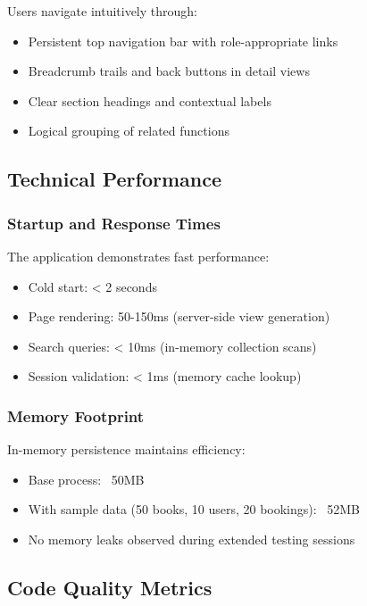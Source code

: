 \documentclass[12pt,a4paper]{article}
\begin{document}
Users navigate intuitively through:

\begin{itemize}[leftmargin=*]
    \item Persistent top navigation bar with role-appropriate links
    \item Breadcrumb trails and back buttons in detail views
    \item Clear section headings and contextual labels
    \item Logical grouping of related functions
\end{itemize}

\subsection{Technical Performance}

\subsubsection{Startup and Response Times}

The application demonstrates fast performance:

\begin{itemize}[leftmargin=*]
    \item Cold start: < 2 seconds
    \item Page rendering: 50-150ms (server-side view generation)
    \item Search queries: < 10ms (in-memory collection scans)
    \item Session validation: < 1ms (memory cache lookup)
\end{itemize}

\subsubsection{Memory Footprint}

In-memory persistence maintains efficiency:

\begin{itemize}[leftmargin=*]
    \item Base process: ~50MB
    \item With sample data (50 books, 10 users, 20 bookings): ~52MB
    \item No memory leaks observed during extended testing sessions
\end{itemize}

\subsection{Code Quality Metrics}
\end{document}
